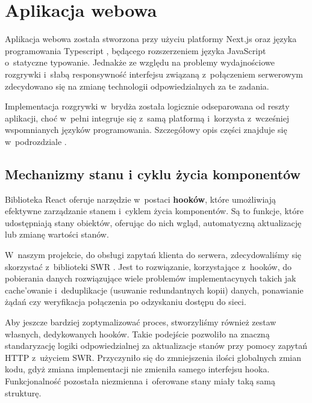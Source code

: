 
\section{Aplikacja webowa}
Aplikacja webowa została stworzona przy użyciu platformy Next.js
\cite{NextJS} oraz języka programowania Typescript \cite{Typescript},
będącego rozszerzeniem języka JavaScript o~statyczne typowanie.
Jednakże ze względu na problemy wydajnościowe rozgrywki
i~słabą responsywność interfejsu związaną z~połączeniem serwerowym
zdecydowano się na zmianę technologii odpowiedzialnych za te zadania.

Implementacja rozgrywki w~brydża została logicznie
odseparowana od reszty aplikacji, choć w~pełni integruje się z~samą
platformą i~korzysta z~wcześniej wspomnianych języków programowania.
Szczegółowy opis części znajduje się w~podrozdziale .

\subsection{Mechanizmy stanu i cyklu życia komponentów}
Biblioteka React oferuje narzędzie w~postaci \textbf{hooków},
które umożliwiają efektywne zarządzanie stanem i~cyklem życia komponentów.
Są to funkcje, które udostępniają stany obiektów, oferując do nich wgląd, automatyczną aktualizację
lub zmianę wartości stanów.

W~naszym projekcie, do obsługi zapytań klienta do serwera, zdecydowaliśmy się
skorzystać z~biblioteki SWR \cite{SWR}.
Jest to rozwiązanie, korzystające z~hooków, do
pobierania danych rozwiązujące wiele problemów implementacynych takich jak
cache'owanie i~deduplikacje (usuwanie redundantnych kopii) danych, ponawianie żądań
czy weryfikacja połączenia po odzyskaniu dostępu do sieci.

Aby jeszcze bardziej zoptymalizować proces, stworzyliśmy
również zestaw własnych, dedykowanych hooków. Takie podejście pozwoliło na
znaczną standaryzację logiki odpowiedzialnej za aktualizacje stanów przy pomocy
zapytań HTTP z~użyciem SWR. Przyczyniło się do zmniejszenia ilości
globalnych zmian kodu, gdyż zmiana implementacji nie zmieniła samego interfejsu
hooka. Funkcjonalność pozostała niezmienna i~oferowane stany miały taką samą strukturę.

